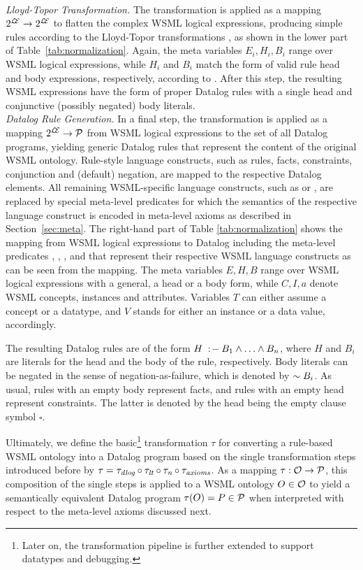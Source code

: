 %
\\[2mm]
{\it Lloyd-Topor Transformation.} The transformation \translt is
applied as a mapping $\powset{\LE} \rightarrow \powset{\LE}$ to
flatten the complex WSML logical expressions, producing simple rules
according to the Lloyd-Topor transformations \cite{lloyd-topor}, as
shown in the lower part of Table~\ref{tab:normalization}. Again, the
meta variables $E_i,H_i,B_i$ range over WSML logical expressions,
while $H_i$ and $B_i$ match the form of valid rule head and body
expressions, respectively, according to \cite{wsml-spec}. After this
step, the resulting WSML expressions have the form of proper Datalog
rules with a single head and conjunctive (possibly negated) body
literals.
%
\\[2mm]
{\it Datalog Rule Generation.} In a final step, the transformation
\transdlog is applied as a mapping $\powset{\LE} \rightarrow \P$
from WSML logical expressions to the set of all Datalog programs,
yielding generic Datalog rules that represent the content of the
original WSML ontology. Rule-style language constructs, such as
rules, facts, constraints, conjunction and (default) negation, are
mapped to the respective Datalog elements. All remaining
WSML-specific language constructs, such as  or
, are replaced by special meta-level predicates for
which the semantics of the respective language construct is encoded
in meta-level axioms as described in Section~\ref{sec:meta}. The
right-hand part of Table \ref{tab:normalization} shows the mapping
from WSML logical expressions to Datalog including the meta-level
predicates \psco, \pmo, \phval, \pitype and \potype that represent
their respective WSML language constructs as can be seen from the
mapping. The meta variables $E,H,B$ range over WSML logical
expressions with a general, a head or a body form, while $C,I,a$
denote WSML concepts, instances and attributes. Variables $T$ can
either assume a concept or a datatype, and $V$ stands for either an
instance or a data value, accordingly.

The resulting Datalog rules are of the form $H \lprl B_1 \dlogand
\dots \dlogand B_n$, where $H$ and $B_i$ are literals for the head
and the body of the rule, respectively. Body literals can be
negated in the sense of negation-as-failure, which is denoted by
$\dlognot B_i$. As usual, rules with an empty body represent
facts, and rules with an empty head represent constraints. The
latter is denoted by the head being the empty clause symbol
$\square$.

Ultimately, we define the basic\footnote{Later on, the
transformation pipeline is further extended to support datatypes
and debugging.} transformation $\tau$ for converting a rule-based
WSML ontology into a Datalog program based on the single
transformation steps introduced before by $ \tau = \transdlog
\circ \translt \circ \transnorm \circ \transax$.
As a mapping $\tau: \O \rightarrow \P$, this composition of the
single steps is applied to a WSML ontology $O \in \O$ to yield a
semantically equivalent Datalog program $\tau (O) = P \in \P$ when
interpreted with respect to the meta-level axioms discussed next.
